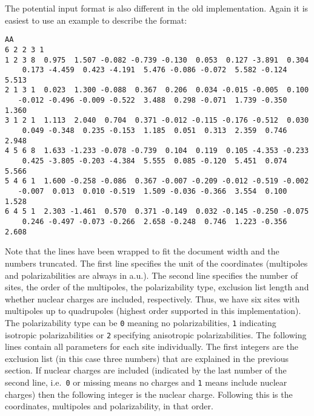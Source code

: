 The potential input format is also different in the old implementation.
Again it is easiest to use an example to describe the format:
\begin{verbatim}
AA
6 2 2 3 1
1 2 3 8  0.975  1.507 -0.082 -0.739 -0.130  0.053  0.127 -3.891  0.304
    0.173 -4.459  0.423 -4.191  5.476 -0.086 -0.072  5.582 -0.124  5.513
2 1 3 1  0.023  1.300 -0.088  0.367  0.206  0.034 -0.015 -0.005  0.100
   -0.012 -0.496 -0.009 -0.522  3.488  0.298 -0.071  1.739 -0.350  1.360
3 1 2 1  1.113  2.040  0.704  0.371 -0.012 -0.115 -0.176 -0.512  0.030
    0.049 -0.348  0.235 -0.153  1.185  0.051  0.313  2.359  0.746  2.948
4 5 6 8  1.633 -1.233 -0.078 -0.739  0.104  0.119  0.105 -4.353 -0.233
    0.425 -3.805 -0.203 -4.384  5.555  0.085 -0.120  5.451  0.074  5.566
5 4 6 1  1.600 -0.258 -0.086  0.367 -0.007 -0.209 -0.012 -0.519 -0.002
   -0.007  0.013  0.010 -0.519  1.509 -0.036 -0.366  3.554  0.100  1.528
6 4 5 1  2.303 -1.461  0.570  0.371 -0.149  0.032 -0.145 -0.250 -0.075
    0.246 -0.497 -0.073 -0.266  2.658 -0.248  0.746  1.223 -0.356  2.608
\end{verbatim}
Note that the lines have been wrapped to fit the document width and the numbers
truncated. The first line specifies the unit of the coordinates (multipoles
and polarizabilities are always in a.u.). The second line specifies the number
of sites, the order of the multipoles, the polarizability type, exclusion list
length and whether nuclear charges are included, respectively. Thus, we have
six sites with multipoles up to quadrupoles (highest order supported in this
implementation). The polarizability type can be \verb|0| meaning no
polarizabilities, \verb|1| indicating isotropic polarizabilities or \verb|2|
specifying anisotropic polarizabilities. The following lines contain all
parameters for each site individually. The first integers are the exclusion
list (in this case three numbers) that are explained in the previous section.
If nuclear charges are included (indicated by the last number of the second
line, i.e.\ \verb|0| or missing means no charges and \verb|1| means include
nuclear charges) then the following integer is the nuclear charge. Following this is
the coordinates, multipoles and polarizability, in that order.
